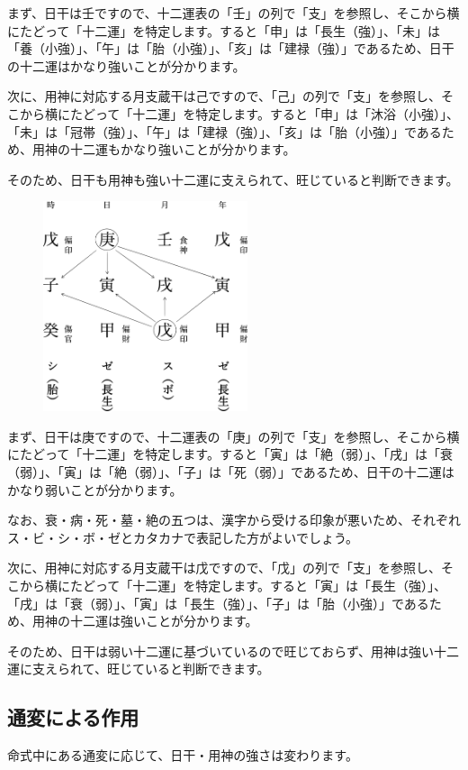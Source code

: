 \documentclass[a5paper,11pt,dvipdfmx]{tarticle}
\begin{document}
まず、日干は壬ですので、十二運表の「壬」の列で「支」を参照し、そこから横にたどって「十二運」を特定します。すると「申」は「長生（強）」、「未」は「養（小強）」、「午」は「胎（小強）」、「亥」は「建禄（強）」であるため、日干の十二運はかなり強いことが分かります。

次に、用神に対応する月支蔵干は己ですので、「己」の列で「支」を参照し、そこから横にたどって「十二運」を特定します。すると「申」は「沐浴（小強）」、「未」は「冠帯（強）」、「午」は「建禄（強）」、「亥」は「胎（小強）」であるため、用神の十二運もかなり強いことが分かります。

そのため、日干も用神も強い十二運に支えられて、旺じていると判断できます。

\begin{figure}[h]
  \includegraphics[width=60mm,angle=90]{figs/figure6-5.eps}
\end{figure}

まず、日干は庚ですので、十二運表の「庚」の列で「支」を参照し、そこから横にたどって「十二運」を特定します。すると「寅」は「絶（弱）」、「戌」は「衰（弱）」、「寅」は「絶（弱）」、「子」は「死（弱）」であるため、日干の十二運はかなり弱いことが分かります。

なお、衰・病・死・墓・絶の五つは、漢字から受ける印象が悪いため、それぞれス・ビ・シ・ボ・ゼとカタカナで表記した方がよいでしょう。

次に、用神に対応する月支蔵干は戊ですので、「戊」の列で「支」を参照し、そこから横にたどって「十二運」を特定します。すると「寅」は「長生（強）」、「戌」は「衰（弱）」、「寅」は「長生（強）」、「子」は「胎（小強）」であるため、用神の十二運は強いことが分かります。

そのため、日干は弱い十二運に基づいているので旺じておらず、用神は強い十二運に支えられて、旺じていると判断できます。

\subsection{通変による作用}
命式中にある通変に応じて、日干・用神の強さは変わります。
\end{document}
